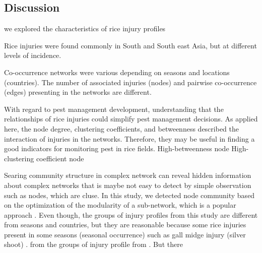 \subsection{Discussion}

we explored the characteristics of rice injury profiles

Rice injuries were found commonly in South and South east Asia, but at different levels of incidence.



Co-occurrence networks were various depending on seasons and locations (countries). The number of associated injuries (nodes) and pairwise co-occurrence (edges) presenting in the networks are different.

With regard to pest management development, understanding that the relationships of rice injuries could simplify pest management decisions. As applied here, the node degree, clustering coefficients, and betweenness described the interaction of injuries in the networks. Therefore, they may be useful in finding a good indicators for monitoring pest in rice fields. High-betweenness node High- clustering coefficient node 



Searing community structure in complex network can reveal hidden information about complex networks that is maybe not easy to detect by simple observation such as nodes, which are cluse. In this study, we detected node community based on the optimization of the modularity of a sub-network, which is a popular approach \cite{Liu_2014_Detecting}. Even though, the groups of injury profiles from this study are different from seasons and countries, but they are reasonable because some rice injuries present in some seasons (seasonal occurrence) such as gall midge injury (silver shoot) \cite{Krishnaiah_2004_Rice}. from the groups of injury profile from \cite{Savary_2000_Characterization}. But there 


